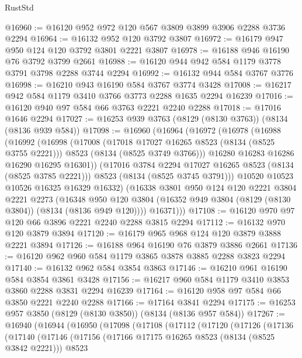 \begin{lexlean}{RustStd}
\begin{coremodule}
{\begin{coremodule}
{{{{{{{{{{{{{{{{{{{{{{{{{{{{{{{{{{{{{{{{{{{{{{{{{{{{{@16960 := @16120 @952 @972 @120 @567 @3809 @3899 @3906 @2288 @3736 @2294
@16964 := @16132 @952 @120 @3792 @3807
@16972 := @16179 @947 @950 @124 @120 @3792 @3801 @2221 @3807
@16978 := @16188 @946 @16190 @76 @3792 @3799 @2661
@16988 := @16120 @944 @942 @584 @1179 @3778 @3791 @3798 @2288 @3744 @2294
@16992 := @16132 @944 @584 @3767 @3776
@16998 := @16210 @943 @16190 @584 @3767 @3774 @3428
@17008 := @16217 @942 @584 @1179 @3410 @3766 @3773 @2288 @1635 @2294 @16239
@17016 := @16120 @940 @97 @584 @66 @3763 @2221 @2240 @2288
@17018 := @17016 @1646 @2294
@17027 := @16253 @939 @3763 (@8129 (@8130 @3763)) (@8134 (@8136 @939 @584))
@17098 := @16960
    (@16964
      (@16972
        (@16978
          (@16988
            (@16992
              (@16998
                (@17008
                  (@17018 @17027 @16265 @8523 (@8134 (@8525 @3755 @2221)))
                  @8523
                  (@8134 (@8525 @3749 @3766)))
                @16280
                @16283
                @16286
                @16290
                @16295
                @16301))
            (@17016 @3784 @2294 @17027 @16265 @8523 (@8134 (@8525 @3785 @2221)))
            @8523
            (@8134 (@8525 @3745 @3791)))
          @10520
          @10523
          @10526
          @16325
          @16329
          @16332)
        (@16338
          @3801
          @950
          @124
          @120
          @2221
          @3804
          @2221
          @2273
          (@16348
            @950
            @120
            @3804
            (@16352 @949 @3804 (@8129 (@8130 @3804)) (@8134 (@8136 @949 @120))))
          @16371)))
@17108 := @16120 @970 @97 @120 @66 @3896 @2221 @2240 @2288 @3815 @2294
@17112 := @16132 @970 @120 @3879 @3894
@17120 := @16179 @965 @968 @124 @120 @3879 @3888 @2221 @3894
@17126 := @16188 @964 @16190 @76 @3879 @3886 @2661
@17136 := @16120 @962 @960 @584 @1179 @3865 @3878 @3885 @2288 @3823 @2294
@17140 := @16132 @962 @584 @3854 @3863
@17146 := @16210 @961 @16190 @584 @3854 @3861 @3428
@17156 := @16217 @960 @584 @1179 @3410 @3853 @3860 @2288 @3831 @2294 @16239
@17164 := @16120 @958 @97 @584 @66 @3850 @2221 @2240 @2288
@17166 := @17164 @3841 @2294
@17175 := @16253 @957 @3850 (@8129 (@8130 @3850)) (@8134 (@8136 @957 @584))
@17267 := @16940
    (@16944
      (@16950
        (@17098
          (@17108
            (@17112
              (@17120
                (@17126
                  (@17136
                    (@17140
                      (@17146
                        (@17156
                          (@17166 @17175 @16265 @8523 (@8134 (@8525 @3842 @2221)))
                          @8523
}}}}}}}}}}}}}}}}}}}}}}}}}}}}}}}}}}}}}}}}}}}}}}}}}}}}}
\end{coremodule}}
\end{coremodule}
\end{lexlean}
